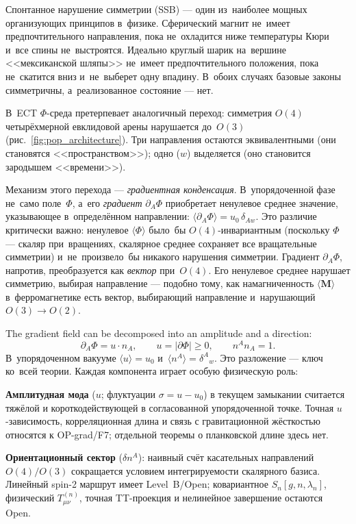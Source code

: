 \documentclass[11pt,a4paper]{article}
\begin{document}
Спонтанное нарушение симметрии (SSB) --- один из~наиболее мощных организующих принципов в~физике. Сферический магнит не~имеет предпочтительного направления, пока не~охладится ниже температуры Кюри и~все спины не~выстроятся. Идеально круглый шарик на~вершине <<мексиканской шляпы>> не~имеет предпочтительного положения, пока не~скатится вниз и~не~выберет одну впадину. В~обоих случаях базовые законы симметричны, а~реализованное состояние --- нет.

В~ECT $\Phi$-среда претерпевает аналогичный переход: симметрия $O(4)$ четырёхмерной евклидовой арены нарушается до~$O(3)$ (рис.~\ref{fig:pop_architecture}). Три направления остаются эквивалентными (они становятся <<пространством>>); одно ($w$) выделяется (оно становится зародышем <<времени>>).

Механизм этого перехода --- \emph{градиентная конденсация}. В~упорядоченной фазе не~само поле~$\Phi$, а~его \emph{градиент} $\partial_A\Phi$ приобретает ненулевое среднее значение, указывающее в~определённом направлении: $\langle\partial_A\Phi\rangle = u_0\,\delta_{Aw}$. Это различие критически важно: ненулевое $\langle\Phi\rangle$ было~бы $O(4)$-инвариантным (поскольку $\Phi$ --- скаляр при~вращениях, скалярное среднее сохраняет все вращательные симметрии) и~не~произвело~бы никакого нарушения симметрии. Градиент $\partial_A\Phi$, напротив, преобразуется как \emph{вектор} при~$O(4)$. Его ненулевое среднее нарушает симметрию, выбирая направление --- подобно тому, как намагниченность $\langle\mathbf{M}\rangle$ в~ферромагнетике есть вектор, выбирающий направление и~нарушающий $O(3) \to O(2)$.

The gradient field can be decomposed into an amplitude and a direction:
\begin{equation}
  \partial_A\Phi = u \cdot n_A,
  \qquad u = |\partial\Phi| \geq 0,
  \qquad n^A n_A = 1.
  \label{eq:pop_polar}
\end{equation}
В~упорядоченном вакууме $\langle u \rangle = u_0$ и~$\langle n^A \rangle = \delta^A{}_w$. Это разложение --- ключ ко~всей теории. Каждая компонента играет особую физическую роль:

\textbf{Амплитудная мода} ($u$; флуктуации $\sigma=u-u_0$) в текущем замыкании считается тяжёлой и короткодействующей в согласованной упорядоченной точке. Точная $u$-зависимость, корреляционная длина и связь с гравитационной жёсткостью относятся к OP-grad/F7; отдельной теоремы о планковской длине здесь нет.

\textbf{Ориентационный сектор} ($\delta n^A$): наивный счёт касательных направлений $O(4)/O(3)$ сокращается условием интегрируемости скалярного базиса. Линейный spin-2 маршрут имеет Level~B/Open; ковариантное $S_n[g,n,\lambda_n]$, физический $T^{(n)}_{\mu\nu}$, точная TT-проекция и нелинейное завершение остаются Open.
\end{document}

